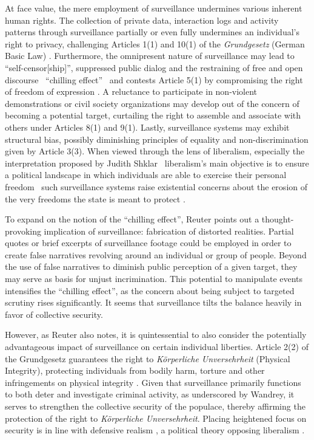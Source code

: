 \documentclass[12pt]{article}
\begin{document}
	At face value, the mere employment of surveillance undermines various inherent human rights. The collection of private data, interaction logs and activity patterns through surveillance partially or even fully undermines an individual's right to privacy, challenging Articles 1(1) and 10(1) of the \textit{Grundgesetz} (German Basic Law) \parencites{nandy2023, wetzling2023, grundgesetz2025}. Furthermore, the omnipresent nature of surveillance may lead to ``self-censor[ship]'', suppressed public dialog and the restraining of free and open discourse \textemdash\ ``chilling effect'' \textemdash\ and contests Article 5(1) by compromising the right of freedom of expression \parencite{murray2024}. A reluctance to participate in non-violent demonstrations or civil society organizations may develop out of the concern of becoming a potential target, curtailing the right to assemble and associate with others under Articles 8(1) and 9(1). Lastly, surveillance systems may exhibit structural bias, possibly diminishing principles of equality and non-discrimination given by Article 3(3). When viewed through the lens of liberalism, especially the interpretation proposed by Judith Shklar \textemdash\ liberalism's main objective is to ensure a political landscape in which individuals are able to exercise their personal freedom \textemdash\ such surveillance systems raise existential concerns about the erosion of the very freedoms the state is meant to protect \parencite[684]{bell2014}.
	
	To expand on the notion of the ``chilling effect'', Reuter points out a thought-provoking implication of surveillance: fabrication of distorted realities. Partial quotes or brief excerpts of surveillance footage could be employed in order to create false narratives revolving around an individual or group of people. Beyond the use of false narratives to diminish public perception of a given target, they may serve as basis for unjust incrimination. This potential to manipulate events intensifies the ``chilling effect'', as the concern about being subject to targeted scrutiny rises significantly. It seems that surveillance tilts the balance heavily in favor of collective security.
	
	However, as Reuter also notes, it is quintessential to also consider the potentially advantageous impact of surveillance on certain individual liberties. Article 2(2) of the Grundgesetz guarantees the right to \textit{Körperliche Unversehrheit} (Physical Integrity), protecting individuals from bodily harm, torture and other infringements on physical integrity \parencite{bildung_korperliche_nodate}. Given that surveillance primarily functions to both deter and investigate criminal activity, as underscored by Wandrey, it serves to strengthen the collective security of the populace, thereby affirming the protection of the right to \textit{Körperliche Unversehrheit}. Placing heightened focus on security is in line with defensive realism \parencite{courseCompanion2024}, a political theory opposing liberalism \parencite{jumarang2011}.  
	
\end{document}
